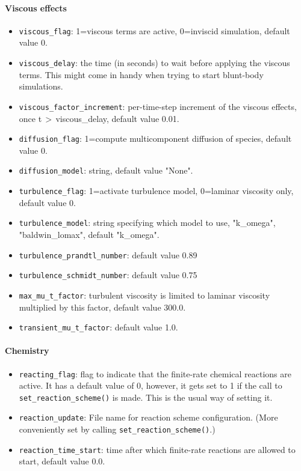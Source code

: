 \documentclass[12pt,a4paper,twoside]{article}
\begin{document}
\paragraph{Viscous effects}
\begin{itemize}
\item \texttt{viscous\_flag}: 1=viscous terms are active, 0=inviscid
  simulation, default value 0.
\item \texttt{viscous\_delay}: the time (in seconds) to wait before applying
  the viscous terms.
  This might come in handy when trying to start blunt-body simulations.
\item \texttt{viscous\_factor\_increment}: per-time-step increment of the viscous effects, once
  t\,$>$\,viscous\_delay, default value 0.01.
\item \texttt{diffusion\_flag}: 1=compute multicomponent diffusion of species, default value 0.
\item \texttt{diffusion\_model}: string, default value "None".
\item \texttt{turbulence\_flag}: 1=activate turbulence model, 0=laminar viscosity only,
  default value 0.
\item \texttt{turbulence\_model}: string specifying which model to use, "k\_omega", "baldwin\_lomax",
  default "k\_omega".
\item \texttt{turbulence\_prandtl\_number}: default value 0.89
\item \texttt{turbulence\_schmidt\_number}: default value 0.75
\item \texttt{max\_mu\_t\_factor}: turbulent viscosity is limited to laminar viscosity multiplied
  by this factor, default value 300.0. 
\item \texttt{transient\_mu\_t\_factor}: default value 1.0.
\end{itemize}

\paragraph{Chemistry}
\begin{itemize}
\item \texttt{reacting\_flag}: flag to indicate that the finite-rate chemical
  reactions are active.
  It has a default value of 0, however, it gets set to 1 if the call 
  to \texttt{set\_reaction\_scheme()} is made.
  This is the usual way of setting it.
\item \texttt{reaction\_update}: File name for reaction scheme configuration.
  (More conveniently set by calling \texttt{set\_reaction\_scheme()}.)
\item \texttt{reaction\_time\_start}: time after which finite-rate reactions are allowed to start,
  default value 0.0.
\end{itemize}
\end{document}
